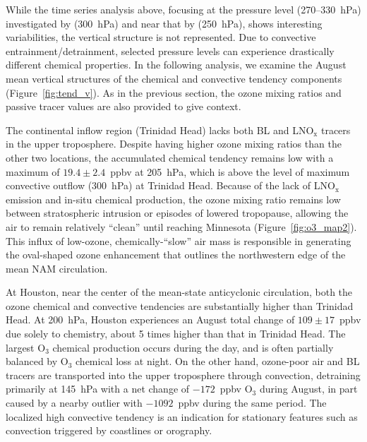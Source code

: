 While the time series analysis above, focusing at the pressure level (270--330~hPa) investigated by \citet{Li:2005ss}
(300~hPa) and near that by \citet{Cooper:2007cr} (250~hPa), shows interesting variabilities,
the vertical structure is not represented. Due to convective entrainment/detrainment, selected
pressure levels can experience drastically different chemical properties. In the following
analysis, we examine the August mean vertical structures of the chemical and convective
tendency components (Figure~\ref{fig:tend_v}). As in the previous section, the ozone
mixing ratios and passive tracer values are also provided to give context.

The continental inflow region (Trinidad Head) lacks both BL and LNO$_{\mathrm{x}}$
tracers in the upper troposphere. Despite having higher ozone mixing ratios than the
other two locations, the accumulated chemical tendency remains low with a maximum of
$19.4\pm2.4$~ppbv at 205~hPa, which is above the level of maximum
convective outflow (300~hPa) at Trinidad Head. Because of the lack of
LNO$_{\mathrm{x}}$ emission and  in-situ chemical production,
the ozone mixing ratio remains low between stratospheric intrusion or episodes of lowered tropopause, allowing
the air to remain relatively ``clean'' until reaching Minnesota (Figure~\ref{fig:o3_map2}). This influx of low-ozone, 
chemically-``slow'' air mass is responsible in generating the oval-shaped ozone
enhancement that outlines the northwestern edge of the mean NAM circulation.

At Houston, near the center of the mean-state anticyclonic circulation, both the ozone
chemical and convective tendencies are substantially higher than Trinidad Head. At
200~hPa, Houston experiences an August total change of $109\pm17$~ppbv due
solely to chemistry, about 5 times higher than that in Trinidad Head.
The largest O$_3$ chemical production occurs during the day, and is often partially balanced by O$_3$
chemical loss at night.
On the other hand, ozone-poor air and BL tracers are transported into
the upper troposphere through convection, detraining primarily at 145~hPa with a
net change of $-172$~ppbv O$_3$ during August, in part caused by a nearby outlier
with $-1092$~ppbv during the same period. The localized high convective tendency is
an indication for stationary features such as convection triggered by coastlines
or orography.

